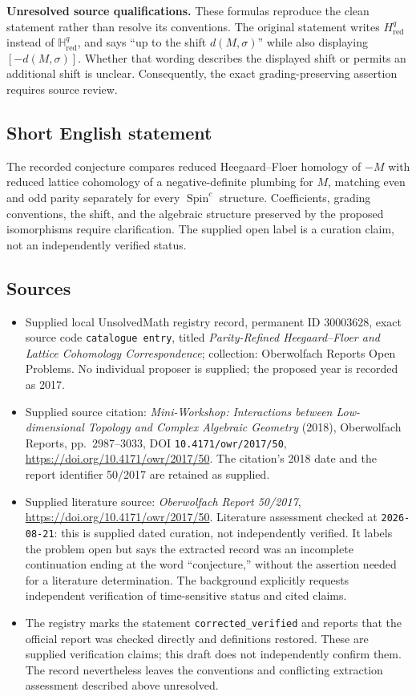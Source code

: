 \documentclass[11pt]{article}
\begin{document}
\textbf{Unresolved source qualifications.} These formulas reproduce the clean statement rather than resolve its conventions. The original statement writes \(H^q_{\mathrm{red}}\) instead of \(\mathbb H^q_{\mathrm{red}}\), and says ``up to the shift \(d(M,\sigma)\)'' while also displaying \([-d(M,\sigma)]\). Whether that wording describes the displayed shift or permits an additional shift is unclear. Consequently, the exact grading-preserving assertion requires source review.
\subsection{Short English statement}
The recorded conjecture compares reduced Heegaard--Floer homology of \(-M\) with reduced lattice cohomology of a negative-definite plumbing for \(M\), matching even and odd parity separately for every \(\operatorname{Spin}^c\) structure. Coefficients, grading conventions, the shift, and the algebraic structure preserved by the proposed isomorphisms require clarification. The supplied open label is a curation claim, not an independently verified status.
\subsection{Sources}
\begin{itemize}
\item Supplied local UnsolvedMath registry record, permanent ID \(30003628\), exact source code \texttt{catalogue entry}, titled \emph{Parity-Refined Heegaard--Floer and Lattice Cohomology Correspondence}; collection: Oberwolfach Reports Open Problems. No individual proposer is supplied; the proposed year is recorded as 2017.
\item Supplied source citation: \emph{Mini-Workshop: Interactions between Low-dimensional Topology and Complex Algebraic Geometry} (2018), Oberwolfach Reports, pp.~2987--3033, DOI \texttt{10.4171/owr/2017/50}, \url{https://doi.org/10.4171/owr/2017/50}. The citation's 2018 date and the report identifier 50/2017 are retained as supplied.
\item Supplied literature source: \emph{Oberwolfach Report 50/2017}, \url{https://doi.org/10.4171/owr/2017/50}. Literature assessment checked at \texttt{2026-08-21}: this is supplied dated curation, not independently verified. It labels the problem open but says the extracted record was an incomplete continuation ending at the word ``conjecture,'' without the assertion needed for a literature determination. The background explicitly requests independent verification of time-sensitive status and cited claims.
\item The registry marks the statement \texttt{corrected\_verified} and reports that the official report was checked directly and definitions restored. These are supplied verification claims; this draft does not independently confirm them. The record nevertheless leaves the conventions and conflicting extraction assessment described above unresolved.
\end{itemize}
\end{document}
